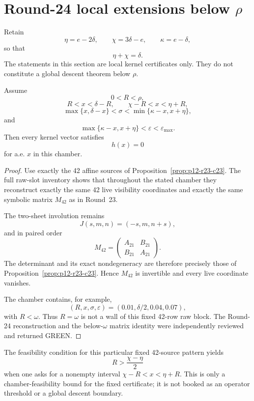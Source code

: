 \section{Round-24 local extensions below \texorpdfstring{$\rho$}{rho}}
\label{sec:p12-round24-local}

Retain
\[
\eta=e-2\delta,\qquad
\chi=3\delta-e,\qquad
\kappa=e-\delta,
\]
so that
\[
\eta+\chi=\delta.
\]
The statements in this section are local kernel certificates only. They do not
constitute a global descent theorem below \(\rho\).

\begin{proposition}
\label{prop:p12-r24-c42}
Assume
\[
0<R<\rho,
\]
\[
R<x<\delta-R,
\qquad
\chi-R<x<\eta+R,
\]
\[
\max\{x,\delta-x\}<\sigma<\min\{\kappa-x,x+\eta\},
\]
and
\[
\max\{\kappa-x,x+\eta\}<\varepsilon<\varepsilon_{\max}.
\]
Then every kernel vector satisfies
\[
\boxed{h(x)=0}
\]
for a.e. \(x\) in this chamber.
\end{proposition}

\begin{proof}
Use exactly the 42 affine sources of Proposition~\ref{prop:p12-r23-c23}.
The full raw-slot inventory shows that throughout the stated chamber they
reconstruct exactly the same 42 live visibility coordinates and exactly the
same symbolic matrix \(M_{42}\) as in Round~23.

The two-sheet involution remains
\[
J(s,m,n)=(-s,m,n+s),
\]
and in paired order
\[
M_{42}=\begin{pmatrix}A_{21}&B_{21}\\B_{21}&A_{21}\end{pmatrix}.
\]
The determinant and its exact nondegeneracy are therefore precisely those of
Proposition~\ref{prop:p12-r23-c23}. Hence \(M_{42}\) is invertible and every
live coordinate vanishes.

The chamber contains, for example,
\[
(R,x,\sigma,\varepsilon)=(0.01,\delta/2,0.04,0.07),
\]
with \(R<\omega\). Thus \(R=\omega\) is not a wall of this fixed 42-row
raw block. The Round-24 reconstruction and the below-\(\omega\) matrix
identity were independently reviewed and returned GREEN.
\end{proof}

\begin{remark}
The feasibility condition for this particular fixed 42-source pattern yields
\[
R>\frac{\chi-\eta}{2}
\]
when one asks for a nonempty interval
\(\chi-R<x<\eta+R\). This is only a chamber-feasibility bound for the fixed
certificate; it is not booked as an operator threshold or a global descent
boundary.
\end{remark}

